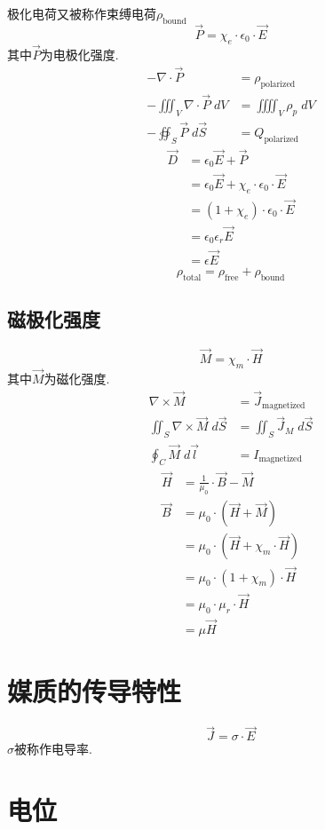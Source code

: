 \documentclass[a4paper]{report}
\begin{document}
\label{sec:polarized}
极化电荷又被称作束缚电荷$\rho_\text{bound}$
$$\vec{P}=\chi_e\cdot \epsilon_0\cdot \vec{E}$$
其中$\vec{P}$为电极化强度. 
\begin{align*}
    -\nabla\cdot \vec{P}&=\rho_{\text{polarized}}\\
    -\iiint_V \nabla\cdot \vec{P}\; dV&=\iiiint_V \rho_p \; dV\\
    -\oiint_S \vec{P} \; d\vec{S}&=Q_\text{polarized}
\end{align*}
\begin{align*}
    \vec{D}
    &=\epsilon_0 \vec{E}+\vec{P}  \\
    &=\epsilon_0 \vec{E}+\chi_e\cdot \epsilon_0\cdot \vec{E}\\
    &=(1+\chi_e)\cdot \epsilon_0\cdot \vec{E}\\
    &=\epsilon_0\epsilon_r \vec{E}\\
    &=\epsilon \vec{E}
\end{align*}
$$\rho_{\text{total}}=\rho_{\text{free}}+\rho_{\text{bound}}$$
\subsection{磁极化强度}
\label{sec:manetized}
$$\vec{M}=\chi_m \cdot\vec{H} $$
其中$\vec{M}$为磁化强度. 
\begin{align*}
    \nabla\times \vec{M}&=\vec{J}_{\text{magnetized}}\\
    \iint_S \nabla\times \vec{M}\; d\vec{S}&= \iint_S \vec{J}_M \; d\vec{S}\\
    \oint_C \vec{M}\; d\vec{l}&=I_{\text{magnetized}}
\end{align*}
\begin{align*}
    \vec{H}&=\frac{1}{\mu_0}\cdot\vec{B}-\vec{M}\\
    \vec{B}&=\mu_0\cdot(\vec{H}+\vec{M}) \\
    &=\mu_0\cdot(\vec{H}+\chi_m\cdot\vec{H})\\
    &=\mu_0\cdot (1+\chi_m)\cdot\vec{H}\\
    &=\mu_0\cdot\mu_r\cdot\vec{H}\\
    &=\mu\vec{H}
\end{align*}
\section{媒质的传导特性}
$$\vec{J}=\sigma\cdot\vec{E}$$
$\sigma$被称作电导率. 
\section{电位}
\end{document}
